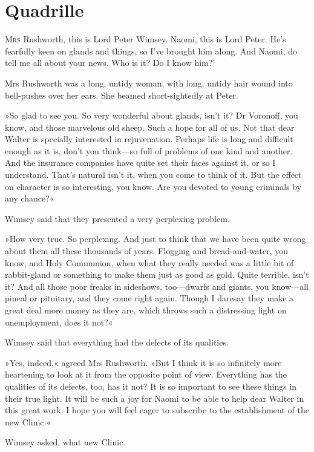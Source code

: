 \chapter{Quadrille}

\lettrine[lines=4,ante=‘]{M}{rs} Rushworth, this is Lord Peter Wimsey. Naomi, this is Lord Peter. He's fearfully keen on glands and things, so I've brought him along. And Naomi, do tell me all about your news. Who is it? Do I know him?'

Mrs Rushworth was a long, untidy woman, with long, untidy hair wound into bell-pushes over her ears. She beamed short-sightedly at Peter.

»So glad to see you. So very wonderful about glands, isn't it? Dr Voronoff, you know, and those marvelous old sheep. Such a hope for all of us. Not that dear Walter is specially interested in rejuvenation. Perhaps life is long and difficult enough as it is, don't you think—so full of problems of one kind and another. And the insurance companies have quite set their faces against it, or so I understand. That's natural isn't it, when you come to think of it. But the effect on character is so interesting, you know. Are you devoted to young criminals by any chance?«

Wimsey said that they presented a very perplexing problem.

»How very true. So perplexing. And just to think that we have been quite wrong about them all these thousands of years. Flogging and bread-and-water, you know, and Holy Communion, when what they really needed was a little bit of rabbit-gland or something to make them just as good as gold. Quite terrible, isn't it? And all those poor freaks in sideshows, too—dwarfs and giants, you know—all pineal or pituitary, and they come right again. Though I daresay they make a great deal more money as they are, which throws such a distressing light on unemployment, does it not?«

Wimsey said that everything had the defects of its qualities.

»Yes, indeed,« agreed Mrs Rushworth. »But I think it is so infinitely more heartening to look at it from the opposite point of view. Everything has the qualities of its defects, too, has it not? It is so important to see these things in their true light. It will be such a joy for Naomi to be able to help dear Walter in this great work. I hope you will feel eager to subscribe to the establishment of the new Clinic.«

Wimsey asked, what new Clinic.

